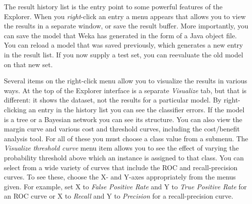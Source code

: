 The result history list is the entry point to some powerful features
of the Explorer. When you \textit{right}-click an entry a menu appears that
allows you to view the results in a separate window, or save the
result buffer. More importantly, you can save the model that Weka has
generated in the form of a Java object file. You can reload a model
that was saved previously, which generates a new entry in the result
list. If you now supply a test set, you can reevaluate the old model
on that new set.

Several items on the right-click menu allow you to visualize the
results in various ways. At the top of the Explorer interface is a
separate \textit{Visualize} tab, but that is different: it shows the
dataset, not the results for a particular model. By right-clicking an
entry in the history list you can see the classifier errors. If the
model is a tree or a Bayesian network you can see its structure. You
can also view the margin curve and various cost and threshold curves,
including the cost/benefit analysis tool. For all of these you must
choose a class value from a submenu. The \textit{Visualize threshold
  curve} menu item allows you to see the effect of varying the
probability threshold above which an instance is assigned to that
class. You can select from a wide variety of curves that include the
ROC and recall-precision curves. To see these, choose the X- and
Y-axes appropriately from the menus given. For example, set X to
\textit{False Positive Rate} and Y to \textit{True Positive Rate} for
an ROC curve or X to \textit{Recall} and Y to \textit{Precision} for a
recall-precision curve.

